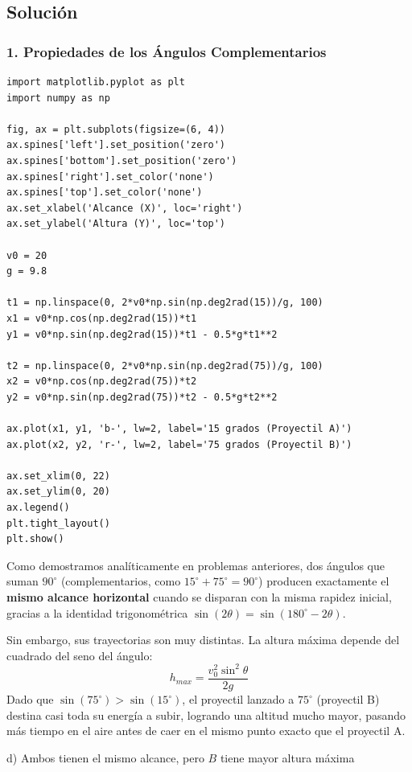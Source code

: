 \documentclass[12pt, a4paper]{article}
\begin{document}
\subsection*{Solución}

\subsubsection*{1. Propiedades de los Ángulos Complementarios}

\begin{verbatim}
import matplotlib.pyplot as plt
import numpy as np

fig, ax = plt.subplots(figsize=(6, 4))
ax.spines['left'].set_position('zero')
ax.spines['bottom'].set_position('zero')
ax.spines['right'].set_color('none')
ax.spines['top'].set_color('none')
ax.set_xlabel('Alcance (X)', loc='right')
ax.set_ylabel('Altura (Y)', loc='top')

v0 = 20
g = 9.8

t1 = np.linspace(0, 2*v0*np.sin(np.deg2rad(15))/g, 100)
x1 = v0*np.cos(np.deg2rad(15))*t1
y1 = v0*np.sin(np.deg2rad(15))*t1 - 0.5*g*t1**2

t2 = np.linspace(0, 2*v0*np.sin(np.deg2rad(75))/g, 100)
x2 = v0*np.cos(np.deg2rad(75))*t2
y2 = v0*np.sin(np.deg2rad(75))*t2 - 0.5*g*t2**2

ax.plot(x1, y1, 'b-', lw=2, label='15 grados (Proyectil A)')
ax.plot(x2, y2, 'r-', lw=2, label='75 grados (Proyectil B)')

ax.set_xlim(0, 22)
ax.set_ylim(0, 20)
ax.legend()
plt.tight_layout()
plt.show()
\end{verbatim}

Como demostramos analíticamente en problemas anteriores, dos ángulos que suman $90^\circ$ (complementarios, como $15^\circ + 75^\circ = 90^\circ$) producen exactamente el \textbf{mismo alcance horizontal} cuando se disparan con la misma rapidez inicial, gracias a la identidad trigonométrica $\sin(2\theta) = \sin(180^\circ - 2\theta)$.

Sin embargo, sus trayectorias son muy distintas. La altura máxima depende del cuadrado del seno del ángulo:
$$ h_{max} = \frac{v_0^2 \sin^2\theta}{2g} $$
Dado que $\sin(75^\circ) > \sin(15^\circ)$, el proyectil lanzado a $75^\circ$ (proyectil B) destina casi toda su energía a subir, logrando una altitud mucho mayor, pasando más tiempo en el aire antes de caer en el mismo punto exacto que el proyectil A.

\begin{tcolorbox}[colback=green!5!white, colframe=green!50!black, title=Respuesta Final]
\centering \Large d) Ambos tienen el mismo alcance, pero $B$ tiene mayor altura máxima
\end{tcolorbox}
\end{document}
